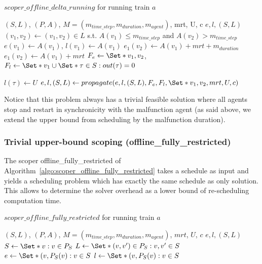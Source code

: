 \documentclass{article}
\begin{document}
\begin{algorithm}
	\caption{$scoper\_offline\_delta\_running$ for running train $a$} \label{algo:scoper_offline_delta_running}
	\begin{algorithmic}[1]
		\Require $(S,L)$, $(P,A)$, $M=(m_{time\_step},m_{duration},m_{agent})$, mrt, U, c
	    \Ensure $e,l,(S,L)$
	    \State $(v_1,v_2) \leftarrow (v_1,v_2) \in L$ s.t. $A(v_1)\leq m_{time\_step}$ and $A(v_2)>m_{time\_step}$
		\State $e(v_1)\leftarrow A(v_1)$, $l(v_1) \leftarrow A(v_1)$
            \State $e_1(v_2) \leftarrow A(v_1)+mrt+m_{duration}$
        \Else
            \State $e_1(v_2) \leftarrow A(v_1)+mrt$
        \EndIf
        \State $F_e \leftarrow \Set*{v_1,v_2}$, $F_l \leftarrow \Set*{v_1} \cup \Set*{\tau \in S: out(\tau)=0}$

	        \State $l(\tau) \leftarrow U$
	    \EndFor
		\State $e,l,(S,L) \leftarrow propagate(e,l,(S,L),F_e,F_l, \Set*{v_1,v_2}, mrt, U, c)$
	\end{algorithmic}
\end{algorithm}


Notice that this problem always has a trivial feasible solution where all agents stop and restart in synchronicity with the malfunction agent (as said above, we extend the upper bound from scheduling by the malfunction duration).


\subsubsection{Trivial upper-bound scoping (offline\_fully\_restricted)}
\label{subsubsec:scope_fully_restricted}

The scoper offline\_fully\_restricted of Algorithm~\ref{algo:scoper_offline_fully_restricted} takes a schedule as input and yields a scheduling problem which has exactly the same schedule as only solution. This allows to determine the solver overhead as a lower bound of re-scheduling computation time.



\begin{algorithm}
	\caption{$scoper\_offline\_fully\_restricted$ for running train $a$} \label{algo:scoper_offline_fully_restricted}
	\begin{algorithmic}[1]
		\Require $(S,L)$, $(P,A)$, $M=(m_{time\_step},m_{duration},m_{agent})$, $mrt$, $U$, $c$
	    \Ensure $e,l,(S,L)$
        \State $S \leftarrow \Set*{v: v\in P_{S}}$
        \State $L \leftarrow \Set*{(v,v^\prime) \in P_{S}: v,v^\prime \in S}$
        \State $e \leftarrow \Set*{(v,P_S(v): v\in S}$
        \State $l \leftarrow \Set*{(v,P_S(v): v\in S}$
	\end{algorithmic}
\end{algorithm}
\end{document}
